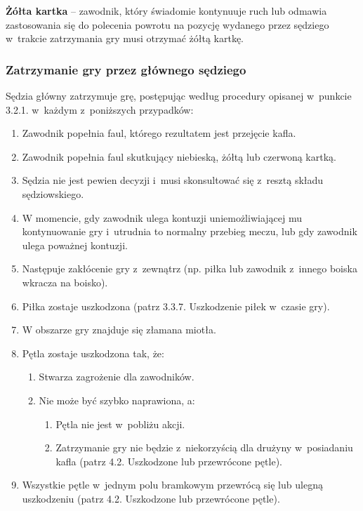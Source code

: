 \documentclass[12pt]{article}
\newcommand\yellowcard[1]{\bgroup\textcolor{darkyellow}{\textbf{#1}}}
\begin{document}
\yellowcard{Żółta kartka} -- zawodnik, który świadomie kontynuuje ruch lub
odmawia zastosowania się do polecenia powrotu na pozycję wydanego przez
sędziego w~trakcie zatrzymania gry musi otrzymać żółtą kartkę.

\subsubsection{Zatrzymanie gry przez głównego sędziego}

Sędzia główny zatrzymuje grę, postępując według procedury opisanej w~punkcie 3.2.1. w~każdym z~poniższych przypadków:

\begin{enumerate}
	\item Zawodnik popełnia faul, którego rezultatem jest przejęcie kafla.

	\item Zawodnik popełnia faul skutkujący niebieską, żółtą lub czerwoną
	      kartką.

	\item Sędzia nie jest pewien decyzji i~musi skonsultować się z~resztą
	      składu sędziowskiego.

	\item W momencie, gdy zawodnik ulega kontuzji uniemożliwiającej mu
	      kontynuowanie gry i~utrudnia to normalny przebieg meczu, lub gdy
	      zawodnik ulega poważnej kontuzji.

	\item Następuje zakłócenie gry z~zewnątrz (np. piłka lub zawodnik z~innego
	      boiska wkracza na boisko).

	\item Piłka zostaje uszkodzona (patrz 3.3.7. Uszkodzenie piłek w~czasie
	      gry).

	\item W obszarze gry znajduje się złamana miotła.

	\item Pętla zostaje uszkodzona tak, że:
	      \begin{enumerate}
		      \item Stwarza zagrożenie dla zawodników.

		      \item Nie może być szybko naprawiona, a:

		            \begin{enumerate}
			            \item
			                  Pętla nie jest w~pobliżu akcji.
			            \item
			                  Zatrzymanie gry nie będzie z~niekorzyścią dla drużyny w~posiadaniu
			                  kafla (patrz 4.2. Uszkodzone lub przewrócone pętle).
		            \end{enumerate}
	      \end{enumerate}
	\item Wszystkie pętle w~jednym polu bramkowym przewrócą się lub ulegną
	      uszkodzeniu (patrz 4.2. Uszkodzone lub przewrócone pętle).


\end{enumerate}
\end{document}

